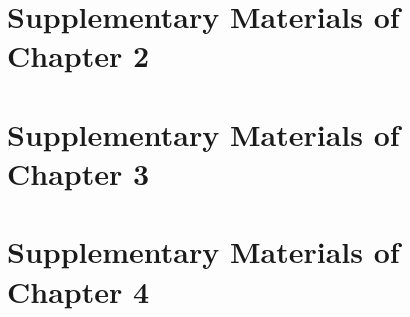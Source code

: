 \documentclass[12pt,leqno]{report}
\begin{document}
\clearpage
\chapter{Supplementary Materials of Chapter 2}
\clearpage

\chapter{Supplementary Materials of Chapter 3}
\clearpage

\chapter{Supplementary Materials of Chapter 4}
\clearpage



\end{document}
